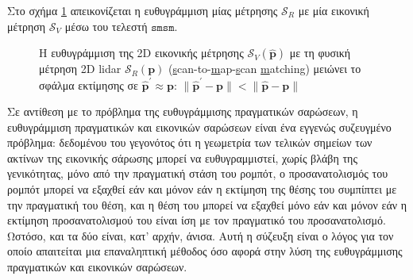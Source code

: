 Στο σχήμα \ref{fig:smsm_principle} απεικονίζεται η ευθυγράμμιση μίας μέτρησης
$\mathcal{S}_R$ με μία εικονική μέτρηση $\mathcal{S}_V$ μέσω του τελεστή
$\texttt{smsm}$.


\begin{figure}[htbp]\centering
  
  \vspace{0.5cm}
  \caption{\small Η ευθυγράμμιση της 2D εικονικής μέτρησης $\mathcal{S}_V(\hat{\bm{p}})$ με
           τη φυσική μέτρηση 2D lidar $\mathcal{S}_R(\bm{p})$
           (\underline{s}can-to-\underline{m}ap-\underline{s}can
           \underline{m}atching) μειώνει το σφάλμα εκτίμησης σε
           $\hat{\bm{p}}^\prime \approx \bm{p}$:
           $\|\hat{\bm{p}}^\prime - \bm{p}\| < \|\hat{\bm{p}}- \bm{p}\|$}
  \label{fig:smsm_principle}
\end{figure}





\begin{gg_box}
\begin{remark}
\label{rem:iterative}
Σε αντίθεση με το πρόβλημα της ευθυγράμμισης πραγματικών σαρώσεων, η
ευθυγράμμιση πραγματικών και εικονικών σαρώσεων είναι ένα εγγενώς συζευγμένο
πρόβλημα: δεδομένου του γεγονότος ότι η γεωμετρία των τελικών σημείων των
ακτίνων της εικονικής σάρωσης μπορεί να ευθυγραμμιστεί, χωρίς βλάβη της
γενικότητας, μόνο από την πραγματική στάση του ρομπότ, ο προσανατολισμός του
ρομπότ μπορεί να εξαχθεί εάν και μόνον εάν η εκτίμηση της θέσης του συμπίπτει
με την πραγματική του θέση, και η θέση του μπορεί να εξαχθεί μόνο εάν και
μόνον εάν η εκτίμηση προσανατολισμού του είναι ίση με τον πραγματικό του
προσανατολισμό. Ωστόσο, και τα δύο είναι, κατ' αρχήν, άνισα. Αυτή η σύζευξη
είναι ο λόγος για τον οποίο απαιτείται μια επαναληπτική μέθοδος όσο αφορά
στην λύση της ευθυγράμμισης πραγματικών και εικονικών σαρώσεων.
\end{remark}
\end{gg_box}

